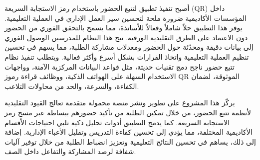 \documentclass[12pt,a4paper]{report}
\begin{document}
\begin{ملخص}
أصبح تنفيذ تطبيق لتتبع الحضور باستخدام رمز الاستجابة السريعة (QR) داخل المؤسسات الأكاديمية ضرورة ملحة لتحسين سير العمل الإداري في العملية التعليمية. يوفر هذا التطبيق حلاً شاملاً وفعالاً للأساتذة، مما يسمح بالتحقق الفوري من الحضور دون الاعتماد على الطرق التقليدية الورقية.
تيح هذا النظام للمدرسين الوصول الفوري إلى بيانات دقيقة ومحدّثة حول الحضور ومعدلات مشاركة الطلبة، مما يسهم في تحسين تنظيم العملية التعليمية واتخاذ القرارات بشكل أسرع وأكثر فعالية. ويتطلب تنفيذ نظام تتبع حضور ناجح دمج تقنيات حديثة، مثل قواعد البيانات المركزية الآمنة، وواجهات الاستخدام السهلة على الهواتف الذكية، ووظائف قراءة رموز QR الموثوقة، لضمان الكفاءة، والسرعة، والحد من محاولات التلاعب.

يركّز هذا المشروع على تطوير ونشر منصة محمولة متقدمة تعالج القيود التقليدية لأنظمة تتبع الحضور، من خلال تمكين الطلبة من تأكيد حضورهم ببساطة عبر مسح رمز الاستجابة السريعة. كما يدمج التطبيق أدوات تحليل ذكية تلبي احتياجات الأقسام الأكاديمية المختلفة، مما يؤدي إلى تحسين كفاءة التدريس وتقليل الأعباء الإدارية. إضافة إلى ذلك، يساهم في تحسين النتائج التعليمية وتعزيز انضباط الطلبة من خلال توفير آليات شفافة لرصد المشاركة والتفاعل داخل الصف.
\end{ملخص}




\newpage
\newenvironment{Acknowledgment}{
    \newpage
    \phantomsection
    \addcontentsline{toc}{chapter}{Acknowledgment}
    \begin{center}
        {\color{mintgreen} \rule{\textwidth}{2pt} }\\[0.3cm]
        {\Large \textbf{Acknowledgment}}\\[0.3cm]
        {\color{mintgreen} \rule{0.8\textwidth}{1.5pt} }
    \end{center}
    \vspace{0.5cm}
    \noindent
}{
    \vspace{0.5cm}
    \begin{center}
        {\color{mintgreen} \rule{0.8\textwidth}{1.5pt} }\\[0.3cm]
        {\color{mintgreen} \rule{\textwidth}{2pt} }
    \end{center}
}
\end{document}
